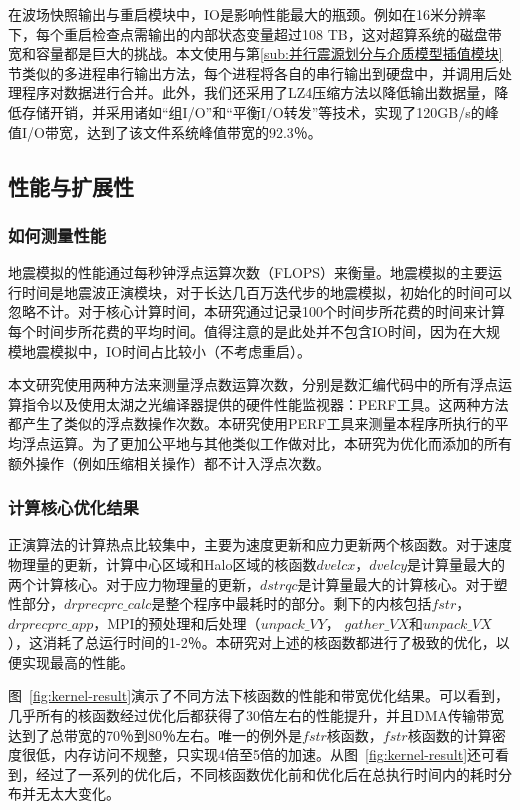 在波场快照输出与重启模块中，IO是影响性能最大的瓶颈。例如在16米分辨率下，每个重启检查点需输出的内部状态变量超过108 TB，这对超算系统的磁盘带宽和容量都是巨大的挑战。本文使用与第\ref{sub:并行震源划分与介质模型插值模块}节类似的多进程串行输出方法，每个进程将各自的串行输出到硬盘中，并调用后处理程序对数据进行合并。此外，我们还采用了LZ4压缩方法以降低输出数据量，降低存储开销，并采用诸如“组I/O”和“平衡I/O转发”等技术，实现了120GB/s的峰值I/O带宽，达到了该文件系统峰值带宽的92.3％。

\subsection{性能与扩展性}

\subsubsection{如何测量性能}

地震模拟的性能通过每秒钟浮点运算次数（FLOPS）来衡量。地震模拟的主要运行时间是地震波正演模块，对于长达几百万迭代步的地震模拟，初始化的时间可以忽略不计。对于核心计算时间，本研究通过记录100个时间步所花费的时间来计算每个时间步所花费的平均时间。值得注意的是此处并不包含IO时间，因为在大规模地震模拟中，IO时间占比较小（不考虑重启）。

本文研究使用两种方法来测量浮点数运算次数，分别是数汇编代码中的所有浮点运算指令以及使用太湖之光编译器提供的硬件性能监视器：PERF工具。这两种方法都产生了类似的浮点数操作次数。本研究使用PERF工具来测量本程序所执行的平均浮点运算。为了更加公平地与其他类似工作做对比，本研究为优化而添加的所有额外操作（例如压缩相关操作）都不计入浮点次数。

\subsubsection{计算核心优化结果}

正演算法的计算热点比较集中，主要为速度更新和应力更新两个核函数。对于速度物理量的更新，计算中心区域和Halo区域的核函数$ dvelcx，dvelcy $是计算量最大的两个计算核心。对于应力物理量的更新，$ dstrqc $是计算量最大的计算核心。对于塑性部分，$ drprecprc\_calc $是整个程序中最耗时的部分。剩下的内核包括$ fstr $，$ drprecprc\_app $，MPI的预处理和后处理（$ unpack\_VY $，
$ gather\_VX $和$ unpack\_VX $），这消耗了总运行时间的1-2％。本研究对上述的核函数都进行了极致的优化，以便实现最高的性能。

图~\ref{fig:kernel-result}演示了不同方法下核函数的性能和带宽优化结果。可以看到，几乎所有的核函数经过优化后都获得了30倍左右的性能提升，并且DMA传输带宽达到了总带宽的70％到80％左右。唯一的例外是$ fstr $核函数，$fstr$核函数的计算密度很低，内存访问不规整，只实现4倍至5倍的加速。从图~\ref{fig:kernel-result}还可看到，经过了一系列的优化后，不同核函数优化前和优化后在总执行时间内的耗时分布并无太大变化。

